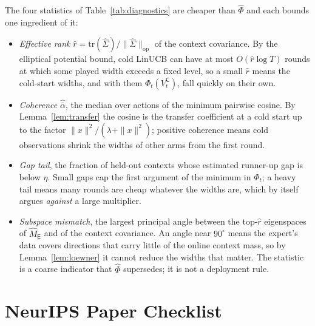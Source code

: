 \documentclass{article}
\theoremstyle{definition}
\theoremstyle{remark}
\theoremstyle{remark}
\newcommand{\Cold}{\mathsf{C}}
\newcommand{\Exp}{\mathsf{E}}
\begin{document}
The four statistics of Table~\ref{tab:diagnostics} are cheaper than
$\widehat\Phi$ and each bounds one ingredient of it:
\begin{itemize}[itemsep=1pt,topsep=1pt,leftmargin=*]
\item \emph{Effective rank} $\widehat r=\mathrm{tr}(\widehat\Sigma)/\|\widehat\Sigma\|_{\mathrm{op}}$
of the context covariance. By the elliptical potential bound, cold LinUCB can
have at most $O(\widehat r\log T)$ rounds at which some played width exceeds
a fixed level, so a small $\widehat r$ means the cold-start widths, and with
them $\Phi_t(V^{\Cold}_t)$, fall quickly on their own.
\item \emph{Coherence} $\widehat{\bar\alpha}$, the median over actions of the
minimum pairwise cosine. By Lemma~\ref{lem:transfer} the cosine is the
transfer coefficient at a cold start up to the factor $\|x\|^2/(\lambda+\|x\|^2)$;
positive coherence means cold observations shrink the widths of other
arms from the first round.
\item \emph{Gap tail}, the fraction of held-out contexts whose estimated
runner-up gap is below $\eta$. Small gaps cap the first argument of the
minimum in $\Phi_t$; a heavy tail means many rounds are cheap whatever the
widths are, which by itself argues \emph{against} a large multiplier.
\item \emph{Subspace mismatch}, the largest principal angle between the
top-$\widehat r$ eigenspaces of $\widehat M_{\Exp}$ and of the context
covariance. An angle near $90^\circ$ means the expert's data covers
directions that carry little of the online context mass, so by
Lemma~\ref{lem:loewner} it cannot reduce the widths that matter. The
statistic is a coarse indicator that $\widehat\Phi$ supersedes; it is not a
deployment rule.
\end{itemize}

\section*{NeurIPS Paper Checklist}
\end{document}
